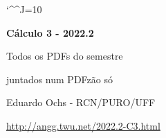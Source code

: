 \documentclass[oneside,12pt]{article}
\begin{document}

\def\u#1{\par{\footnotesize \url{#1}}}

\def\drafturl{http://angg.twu.net/LATEX/2022-2-C3.pdf}
\def\drafturl{http://angg.twu.net/2022.2-C3.html}
\def\draftfooter{\tiny \href{\drafturl}{\jobname{}} \ColorBrown{\shorttoday{} \hours}}

\catcode`\^^J=10
\pu



%

\thispagestyle{empty}

\begin{center}

\vspace*{1.2cm}

{\bf \Large Cálculo 3 - 2022.2}

\bsk

Todos os PDFs do semestre

juntados num PDFzão só

\bsk

Eduardo Ochs - RCN/PURO/UFF

\url{http://angg.twu.net/2022.2-C3.html}

\end{center}

\newpage



\end{document}
